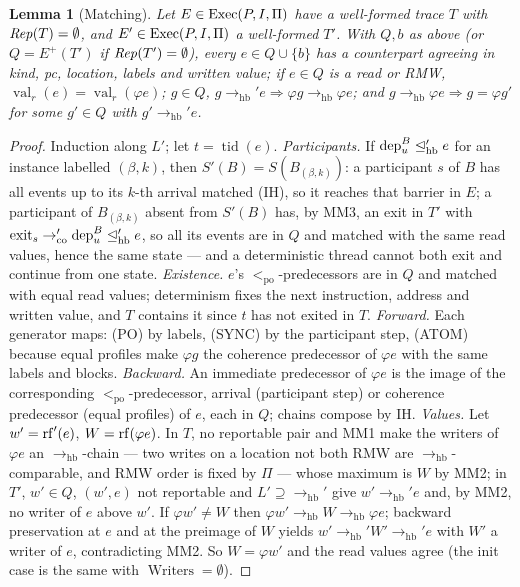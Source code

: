\documentclass[11pt]{article}
\newtheorem{lemma}[theorem]{Lemma}
\theoremstyle{remark}
\DeclareMathOperator{\tid}{tid}\DeclareMathOperator{\pc}{pc}\DeclareMathOperator{\seq}{seq}
\DeclareMathOperator{\val}{val}\DeclareMathOperator{\Writers}{Writers}\DeclareMathOperator{\DR}{DR}
\newcommand{\PO}{<_{\mathrm{po}}}\newcommand{\HB}{\to_{\mathrm{hb}}}\newcommand{\HBr}{\trianglelefteq_{\mathrm{hb}}}
\newcommand{\CO}{\to_{\mathrm{co}}}\newcommand{\chain}{\rightsquigarrow}
\newcommand{\Eplus}{E^{+}}\newcommand{\Fr}{\mathcal{F}}\newcommand{\Pred}{\mathcal{P}}
\begin{document}
\begin{lemma}[Matching]\label{lem:match}
Let $E\in\operatorname{Exec}(P,I,\Pi)$ have a well-formed trace $T$ with $\mathit{Rep}(T)=\emptyset$, and
$E'\in\operatorname{Exec}(P,I,\Pi)$ a well-formed $T'$. With $Q,b$ as above (or $Q=\Eplus(T')$ if
$\mathit{Rep}(T')=\emptyset$), every $e\in Q\cup\{b\}$ has a counterpart agreeing in kind, pc,
location, labels and written value; if $e\in Q$ is a read or RMW, $\val_r(e)=\val_r(\varphi e)$;
$g\in Q$, $g\HB' e\Rightarrow\varphi g\HB\varphi e$; and $g\HB\varphi e\Rightarrow g=\varphi g'$
for some $g'\in Q$ with $g'\HB' e$.
\end{lemma}
\begin{proof}
Induction along $L'$; let $t=\tid(e)$. \emph{Participants.} If $\dep{u}{B}\HBr' e$ for an
instance labelled $(\beta,k)$, then $S'(B)=S(B_{(\beta,k)})$: a participant $s$ of $B$ has
all events up to its $k$-th arrival matched (IH), so it reaches that barrier in $E$; a
participant of $B_{(\beta,k)}$ absent from $S'(B)$ has, by MM3, an exit in $T'$ with
$\ext{s}\CO'\dep{u}{B}\HBr' e$, so all its events are in $Q$ and matched with the same read
values, hence the same state --- and a deterministic thread cannot both exit and continue
from one state. \emph{Existence.} $e$'s $\PO$-predecessors are in $Q$ and matched with equal
read values; determinism fixes the next instruction, address and written value, and $T$
contains it since $t$ has not exited in $T$. \emph{Forward.} Each generator maps: (PO) by
labels, (SYNC) by the participant step, (ATOM) because equal profiles make $\varphi g$ the
coherence predecessor of $\varphi e$ with the same labels and blocks. \emph{Backward.} An
immediate predecessor of $\varphi e$ is the image of the corresponding $\PO$-predecessor,
arrival (participant step) or coherence predecessor (equal profiles) of $e$, each in $Q$;
chains compose by IH. \emph{Values.} Let $w'=\operatorname{rf}'(e)$, $W=\operatorname{rf}(\varphi e)$. In $T$, no
reportable pair and MM1 make the writers of $\varphi e$ an $\HB$-chain --- two writes on a
location not both RMW are $\HB$-comparable, and RMW order is fixed by $\Pi$ --- whose
maximum is $W$ by MM2; in $T'$, $w'\in Q$, $(w',e)$ not reportable and $L'\supseteq\HB'$ give
$w'\HB' e$ and, by MM2, no writer of $e$ above $w'$. If $\varphi w'\ne W$ then
$\varphi w'\HB W\HB\varphi e$; backward preservation at $e$ and at the preimage of $W$
yields $w'\HB' W'\HB' e$ with $W'$ a writer of $e$, contradicting MM2. So $W=\varphi w'$ and
the read values agree (the init case is the same with $\Writers=\emptyset$).
\end{proof}
\end{document}
